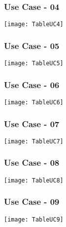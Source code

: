 \begin{figure}[ht]
\subsubsection{Use Case - 04}
\centering
\texttt{[image: TableUC4]}
\end{figure}

\begin{figure}[ht]
\subsubsection{Use Case - 05}
\centering
\texttt{[image: TableUC5]}
\end{figure}

\begin{figure}[ht]
\subsubsection{Use Case - 06}
\centering
\texttt{[image: TableUC6]}
\end{figure}

\begin{figure}[ht]
\subsubsection{Use Case - 07}
\centering
\texttt{[image: TableUC7]}
\end{figure}

\begin{figure}[ht]
\subsubsection{Use Case - 08}
\centering
\texttt{[image: TableUC8]}
\end{figure}

\begin{figure}[ht]
\subsubsection{Use Case - 09}
\centering
\texttt{[image: TableUC9]}
\end{figure}

